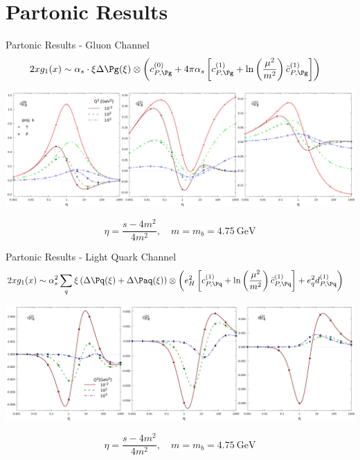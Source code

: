 \section{Partonic Results}
\begin{frame}{Partonic Results - Gluon Channel}
\begin{align*}
2xg_1(x) &\sim \alpha_s\cdot\xi\Delta \Pg(\xi) \otimes \left(c_{P,\Pg}^{(0)} + 4\pi\alpha_s\left[c_{P,\Pg}^{(1)} + \ln\left(\frac{\mu^2}{m^2}\right)\bar c_{P,\Pg}^{(1)}\right]\right)
\end{align*}
\begin{center}
\includegraphics[width=\textwidth]{img/cgTP}
\end{center}
\[\eta = \frac{s-4m^2}{4m^2},\quad m=m_b=\SI{4.75}{\GeV}\]
\end{frame}

\begin{frame}{Partonic Results - Light Quark Channel}
\begin{align*}
2xg_1(x) &\sim \alpha_s^2\sum_{q}\xi\left(\Delta \Pq(\xi)+\Delta \Paq(\xi)\right) \otimes \left(e_H^2\left[c_{P,\Pq}^{(1)} + \ln\left(\frac{\mu^2}{m^2}\right)\bar c_{P,\Pq}^{(1)}\right] + e_q^2 d_{P,\Pq}^{(1)}\right)
\end{align*}
\begin{center}
\includegraphics[width=\textwidth]{img/cdqP}
\end{center}
\[\eta = \frac{s-4m^2}{4m^2},\quad m=m_b=\SI{4.75}{\GeV}\]
\end{frame}
